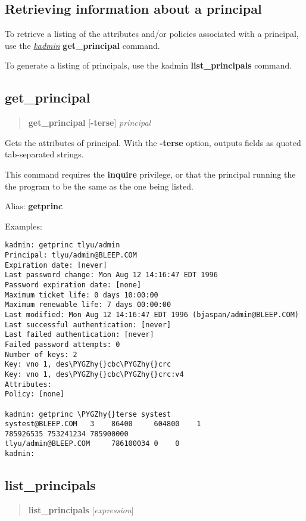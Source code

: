 \documentclass[letterpaper,10pt,english]{sphinxmanual}
\def\PYGZhy{\char`\-}
\begin{document}
\subsection{Retrieving information about a principal}
\label{admin/database:retrieving-information-about-a-principal}
To retrieve a listing of the attributes and/or policies associated
with a principal, use the {\hyperref[admin/admin_commands/kadmin_local:kadmin-1]{\emph{kadmin}}} \textbf{get\_principal} command.

To generate a listing of principals, use the kadmin
\textbf{list\_principals} command.


\subsection{get\_principal}
\label{admin/database:get-principal}\begin{quote}

\textbf{get\_principal} {[}\textbf{-terse}{]} \emph{principal}
\end{quote}

Gets the attributes of principal.  With the \textbf{-terse} option, outputs
fields as quoted tab-separated strings.

This command requires the \textbf{inquire} privilege, or that the principal
running the the program to be the same as the one being listed.

Alias: \textbf{getprinc}

Examples:

\begin{Verbatim}[commandchars=\\\{\}]
kadmin: getprinc tlyu/admin
Principal: tlyu/admin@BLEEP.COM
Expiration date: [never]
Last password change: Mon Aug 12 14:16:47 EDT 1996
Password expiration date: [none]
Maximum ticket life: 0 days 10:00:00
Maximum renewable life: 7 days 00:00:00
Last modified: Mon Aug 12 14:16:47 EDT 1996 (bjaspan/admin@BLEEP.COM)
Last successful authentication: [never]
Last failed authentication: [never]
Failed password attempts: 0
Number of keys: 2
Key: vno 1, des\PYGZhy{}cbc\PYGZhy{}crc
Key: vno 1, des\PYGZhy{}cbc\PYGZhy{}crc:v4
Attributes:
Policy: [none]

kadmin: getprinc \PYGZhy{}terse systest
systest@BLEEP.COM   3    86400     604800    1
785926535 753241234 785900000
tlyu/admin@BLEEP.COM     786100034 0    0
kadmin:
\end{Verbatim}


\subsection{list\_principals}
\label{admin/database:list-principals}\begin{quote}

\textbf{list\_principals} {[}\emph{expression}{]}
\end{quote}
\end{document}
